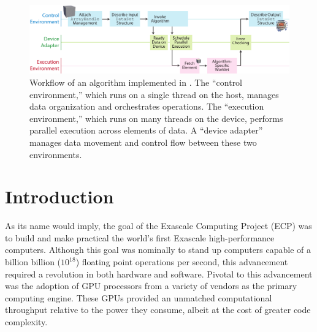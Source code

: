 

\begin{figure}[tb]
  \includegraphics[width=\textwidth]{figures/vtkm-workflow}
  \caption{
    Workflow of an algorithm implemented in \vtkm.
    The ``control environment,'' which runs on a single thread on the host, manages data organization and orchestrates operations.
    The ``execution environment,'' which runs on many threads on the device, performs parallel execution across elements of data.
    A ``device adapter'' manages data movement and control flow between these two environments.
  }
  \label{fig:vtkm-workflow}
\end{figure}


\section{Introduction}




As its name would imply, the goal of the Exascale Computing Project (ECP) was to build and make practical the world's first Exascale high-performance computers.
Although this goal was nominally to stand up computers capable of a billion billion ($10^{18}$) floating point operations per second, this advancement required a revolution in both hardware and software.
Pivotal to this advancement was the adoption of GPU processors from a variety of vendors as the primary computing engine.
These GPUs provided an unmatched computational throughput relative to the power they consume, albeit at the cost of greater code complexity.

